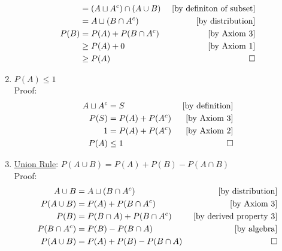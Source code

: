 \documentclass[12pt]{article}
\begin{document}
\begin{enumerate}
\begin{align*}
                    &= (A \sqcup A^c) \cap (A \cup B) &\text{ [by definiton of subset]}\\
                    &= A \sqcup (B \cap A^c) &\text{ [by distribution]}\\
                    P(B) &= P(A) + P(B \cap A^c) &\text{ [by Axiom 3]}\\
                    &\geq P(A) + 0 &\text{ [by Axiom 1]}\\
                    &\geq P(A) &\qed
                \end{align*}
                \item $P(A) \leq 1$
                \\Proof:
                \begin{align*}
                    A \sqcup A^c &= S &\text{ [by definition]}\\
                    P(S) &= P(A) + P(A^c) &\text{ [by Axiom 3]}\\
                    1 &= P(A) + P(A^c) &\text{ [by Axiom 2]}\\
                    P(A) &\leq 1 &\qed
                \end{align*}
                \item \underline{Union Rule}: $P(A \cup B) = P(A) + P(B) - P(A \cap B)$
                \\Proof:
                \begin{align*}
                    A \cup B &= A \sqcup (B \cap A^c) &\text{ [by distribution]}\\
                    P(A \cup B) &= P(A) + P(B \cap A^c) &\text{ [by Axiom 3]}\\
                    P(B) &= P(B \cap A) + P(B \cap A^c) &\text{ [by derived property 3]}\\
                    P(B \cap A^c) &= P(B) - P(B \cap A) &\text{ [by algebra]}\\
                    P(A \cup B) &= P(A) + P(B) - P(B \cap A) &\qed
                \end{align*}
            \end{enumerate}
\end{document}
